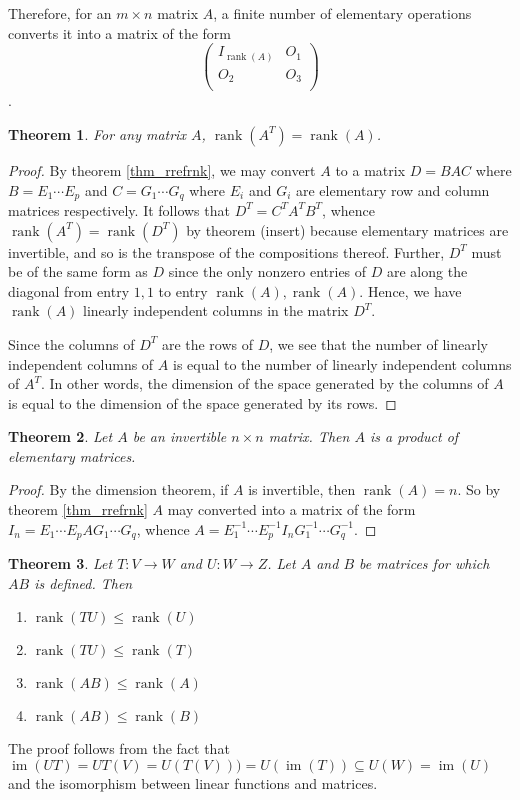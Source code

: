 \documentclass[oneside, 12pt]{book}
\DeclareMathOperator{\rank}{rank}
\DeclareMathOperator{\im}{im}
\newtheorem{thm}{Theorem}[section]
\theoremstyle{definition}
\begin{document}
Therefore, for an $m \times n$ matrix $A$, a finite number of elementary operations converts it into a matrix of the form
\[\begin{pmatrix}
    I_{\rank(A)} & O_{1} \\
    O_{2} & O_{3} \\
  \end{pmatrix}\].
\begin{thm}
  \label{thm_colrow}
  For any matrix $A$, $\rank(A^{T})=\rank(A)$.
\end{thm}
\begin{proof}
  By theorem \ref{thm_rrefrnk}, we may convert $A$ to a matrix $D=BAC$ where $B=E_{1}\cdots E_{p}$ and $C=G_{1}\cdots G_{q}$ where $E_{i}$ and $G_{i}$ are elementary row and column matrices respectively. It follows that $D^{T}=C^{T}A^{T}B^{T}$, whence $\rank(A^{T})=\rank(D^{T})$ by theorem (insert) because elementary
  matrices are invertible, and so is the transpose of the compositions thereof. Further, $D^{T}$ must be of the same form as $D$ since the only nonzero entries of $D$ are along the diagonal from entry $1,1$ to entry $\rank(A), \rank(A)$. Hence, we have $\rank(A)$ linearly independent columns in the matrix $D^{T}$.

  Since the columns of $D^{T}$ are the rows of $D$, we see that the number of linearly independent columns of $A$ is equal to the number of linearly
  independent columns of $A^{T}$. In other words, the dimension of the space generated  by the columns of $A$ is equal to the dimension of the space generated by its rows.
\end{proof}
\begin{thm}
  \label{thm_invm}
  Let $A$ be an invertible $n \times n$ matrix. Then $A$ is a product of elementary matrices.
\end{thm}
\begin{proof}
  By the dimension theorem, if $A$ is invertible,  then $\rank(A)=n$. So by theorem \ref{thm_rrefrnk} $A$ may converted into a matrix of the form
  $I_{n}=E_{1}\cdots E_{p}AG_{1} \cdots G_{q}$, whence $A=E_{1}^{-1}\cdots E_{p}^{-1}I_{n}G_{1}^{-1}\cdots G_{q}^{-1}$.
\end{proof}
\begin{thm}
  \label{thm_rnkinq}
  Let $T:V \to W$ and $U:W \to Z$. Let $A$ and $B$ be matrices for which $AB$ is defined. Then
  \begin{enumerate}
    \item $\rank(TU)\leq \rank(U)$
    \item $\rank(TU) \leq \rank(T)$
    \item $\rank(AB) \leq \rank(A)$
    \item $\rank(AB) \leq \rank(B)$
  \end{enumerate}
\end{thm}
The proof follows from the fact that $\im(UT)=UT(V)=U(T(V)))= U(\im(T)) \subseteq U(W)=\im(U)$ and the isomorphism between linear functions and matrices.
\end{document}

